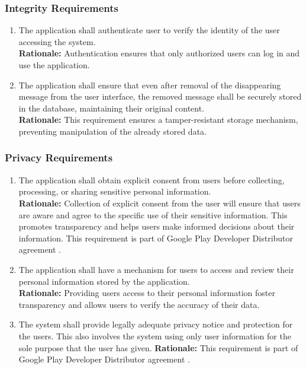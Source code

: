\documentclass[]{article}
\begin{document}
\subsubsection{Integrity Requirements}
\label{ssub:integrity_requirements}
\begin{enumerate}[{SR-INT}1. ]
	\item The application shall authenticate user to verify the identity of the user accessing the system. \\
	      {\bf Rationale:} Authentication ensures that only authorized users can log in and use the application.
	\item The application shall ensure that even after removal of the disappearing message from the user interface,
	      the removed message shall be securely stored in the database, maintaining their original content. \\
	      {\bf Rationale:} This requirement ensures a tamper-resistant storage mechanism, preventing manipulation
	      of the already stored data.
\end{enumerate}
\subsubsection{Privacy Requirements}
\label{ssub:privacy_requirements}
\begin{enumerate}[{SR-P}1. ]
	\item The application shall obtain explicit consent from users before collecting, processing, or sharing sensitive personal information. \\
	      {\bf Rationale:} Collection of explicit consent from the user will ensure that users are aware and agree to the specific use of their sensitive information.
	      This promotes transparency and helps users make informed decisions about their information. This requirement is part of Google Play Developer
	      Distributor agreement \cite{9c}.
	\item The application shall have a mechanism for users to access and review their personal information stored by the application. \\
	      {\bf Rationale:} Providing users access to their personal information foster transparency and allows users to verify the accuracy of their data.
	\item The system shall provide legally adequate privacy notice and protection for the users. This also involves the system using only
	      user information for the sole purpose that the user has given.
		      {\bf Rationale:} This requirement is part of Google Play Developer Distributor agreement \cite{9c}.
\end{enumerate}
\end{document}
